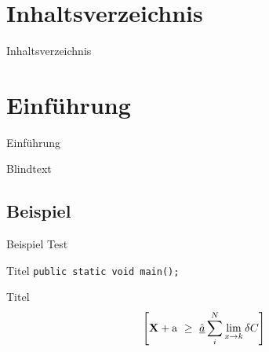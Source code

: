 \documentclass[aspectratio=169, 12pt, mathserif]{beamer}
\title{\thesisTitle{}}
\subtitle{Bachelorverteidigung}
\author[A. Linz]{Andreas Linz}
\institute[]{\thesisUniversityDepartment}
\date{\today}
\begin{document}
    \begin{frame}
        \titlepage
    \end{frame} 
    
    \section{Inhaltsverzeichnis}
    \begin{frame}{Inhaltsverzeichnis}
        \tableofcontents
    \end{frame}

    \section{Einführung}
    \begin{frame}{Einführung}
        \begin{block}{Blindtext}
            \blindtext[1]
        \end{block}
    \end{frame}

    \subsection{Beispiel}
    \begin{frame}{Beispiel}
        Test
        \begin{exampleblock}{Titel}
            \texttt{public static void main();}
        \end{exampleblock}
        \begin{alertblock}{Titel}
            \begin{equation}
            \left[
            {\bf X} + {\rm a} \ \geq\ 
            \underline{\hat a} \sum_i^N \lim_{x \rightarrow k} \delta C
            \right]
            \end{equation}
        \end{alertblock}
    \end{frame}
\end{document}
